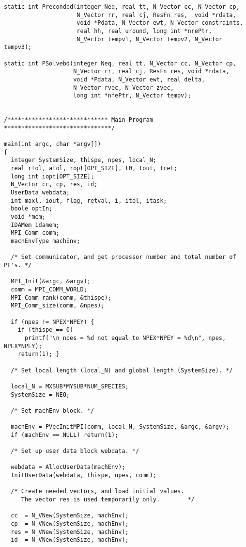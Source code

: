 \documentclass[11pt]{article}
\begin{document}
\begin{verbatim}
static int Precondbd(integer Neq, real tt, N_Vector cc, N_Vector cp,
                     N_Vector rr, real cj, ResFn res,  void *rdata,
                     void *Pdata, N_Vector ewt, N_Vector constraints,
                     real hh, real uround, long int *nrePtr, 
                     N_Vector tempv1, N_Vector tempv2, N_Vector tempv3);

static int PSolvebd(integer Neq, real tt, N_Vector cc, N_Vector cp,
                    N_Vector rr, real cj, ResFn res, void *rdata,
                    void *Pdata, N_Vector ewt, real delta,
                    N_Vector rvec, N_Vector zvec,
                    long int *nfePtr, N_Vector tempv);


/***************************** Main Program *******************************/

main(int argc, char *argv[])
{
  integer SystemSize, thispe, npes, local_N;
  real rtol, atol, ropt[OPT_SIZE], t0, tout, tret;
  long int iopt[OPT_SIZE];
  N_Vector cc, cp, res, id;
  UserData webdata;
  int maxl, iout, flag, retval, i, itol, itask;
  boole optIn;
  void *mem;
  IDAMem idamem;
  MPI_Comm comm;
  machEnvType machEnv;

  /* Set communicator, and get processor number and total number of PE's. */

  MPI_Init(&argc, &argv);
  comm = MPI_COMM_WORLD;
  MPI_Comm_rank(comm, &thispe);
  MPI_Comm_size(comm, &npes);

  if (npes != NPEX*NPEY) {
    if (thispe == 0)
      printf("\n npes = %d not equal to NPEX*NPEY = %d\n", npes, NPEX*NPEY);
    return(1); }

  /* Set local length (local_N) and global length (SystemSize). */

  local_N = MXSUB*MYSUB*NUM_SPECIES;
  SystemSize = NEQ;

  /* Set machEnv block. */

  machEnv = PVecInitMPI(comm, local_N, SystemSize, &argc, &argv);
  if (machEnv == NULL) return(1);

  /* Set up user data block webdata. */

  webdata = AllocUserData(machEnv);
  InitUserData(webdata, thispe, npes, comm);

  /* Create needed vectors, and load initial values.
     The vector res is used temporarily only.        */

  cc  = N_VNew(SystemSize, machEnv);
  cp  = N_VNew(SystemSize, machEnv);
  res = N_VNew(SystemSize, machEnv);
  id  = N_VNew(SystemSize, machEnv);


\end{verbatim}
\end{document}
